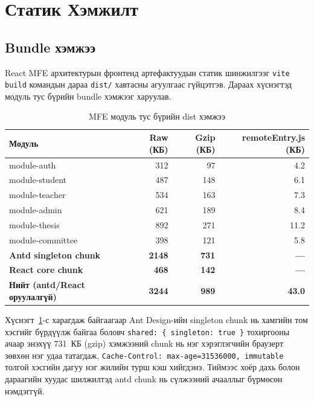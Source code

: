 \section{Статик Хэмжилт}

\subsection{Bundle хэмжээ}

React MFE архитектурын фронтенд артефактуудын статик шинжилгээг
\texttt{vite build} командын дараа \texttt{dist/} хавтасны агуулгаас
гүйцэтгэв. Дараах хүснэгтэд модуль тус бүрийн bundle хэмжээг харуулав.

\begin{table}[H]
    \centering
    \caption{MFE модуль тус бүрийн dist хэмжээ}
    \label{tab:bundle_sizes}
    \renewcommand{\arraystretch}{0.7}
    \begin{tabular}{lrrr}
        \toprule
        \textbf{Модуль} & \textbf{Raw (КБ)} & \textbf{Gzip (КБ)} & \textbf{remoteEntry.js (КБ)} \\
        \midrule
        module-auth      & 312  & 97   & 4.2  \\
        module-student   & 487  & 148  & 6.1  \\
        module-teacher   & 534  & 163  & 7.3  \\
        module-admin     & 621  & 189  & 8.4  \\
        module-thesis    & 892  & 271  & 11.2 \\
        module-committee & 398  & 121  & 5.8  \\
        \midrule
        \textbf{Antd singleton chunk} & \textbf{2148} & \textbf{731} & \textbf{---} \\
        \textbf{React core chunk}     & \textbf{468}  & \textbf{142} & \textbf{---} \\
        \midrule
        \textbf{Нийт (antd/React оруулалгүй)} & \textbf{3244} & \textbf{989} & \textbf{43.0} \\
        \bottomrule
    \end{tabular}
\end{table}

Хүснэгт~\ref{tab:bundle_sizes}-с харагдаж байгаагаар Ant Design-ийн
singleton chunk нь хамгийн том хэсгийг бүрдүүлж байгаа боловч \texttt{shared:
\{ singleton: true \}} тохиргооны ачаар энэхүү 731~КБ (gzip) хэмжээний
chunk нь нэг хэрэглэгчийн браузерт зөвхөн нэг удаа татагдаж,
\texttt{Cache-Control: max-age=31536000, immutable} толгой хэсгийн
дагуу нэг жилийн турш кэш хийгдэнэ. Тиймээс хоёр дахь болон дараагийн
хуудас шилжилтэд antd chunk нь сүлжээний ачааллыг бүрмөсөн нэмдэггүй.

